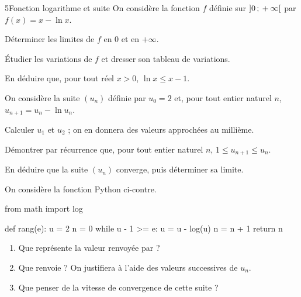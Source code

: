 \begin{exoBac}{5}{Fonction logarithme et suite}
On considère la fonction $f$ définie sur $\mathopen{]}0\,{;}\,+\infty\mathclose{[}$ par $f(x)=x-\ln x$.
\begin{questions}
  \item Déterminer les limites de $f$ en $0$ et en $+\infty$.
  \item Étudier les variations de $f$ et dresser son tableau de variations.
  \item En déduire que, pour tout réel $x>0$, $\ln x\leq x-1$.
\end{questions}
On considère la suite $(u_n)$ définie par $u_0=2$ et, pour tout entier naturel $n$, $u_{n+1}=u_n-\ln u_n$.
\begin{questions}[resume]
  \item Calculer $u_1$ et $u_2$ ; on en donnera des valeurs approchées au millième.
  \item Démontrer par récurrence que, pour tout entier naturel $n$, $1\leq u_{n+1}\leq u_n$.
  \item En déduire que la suite $(u_n)$ converge, puis déterminer sa limite.
  \item On considère la fonction Python ci-contre.
\begin{codecote}[0.44]
\begin{pythoncol}
from math import log

def rang(e):
    u = 2
    n = 0
    while u - 1 >= e:
        u = u - log(u)
        n = n + 1
    return n
\end{pythoncol}
\cote
\begin{enumerate}[label=\alph*),leftmargin=1.4em,itemsep=0.6mm,topsep=0mm]
  \item Que représente la valeur renvoyée par  ?
  \item Que renvoie  ? On justifiera à l'aide des valeurs successives de $u_n$.
  \item Que penser de la vitesse de convergence de cette suite ?
\end{enumerate}
\end{codecote}
\end{questions}
\end{exoBac}


